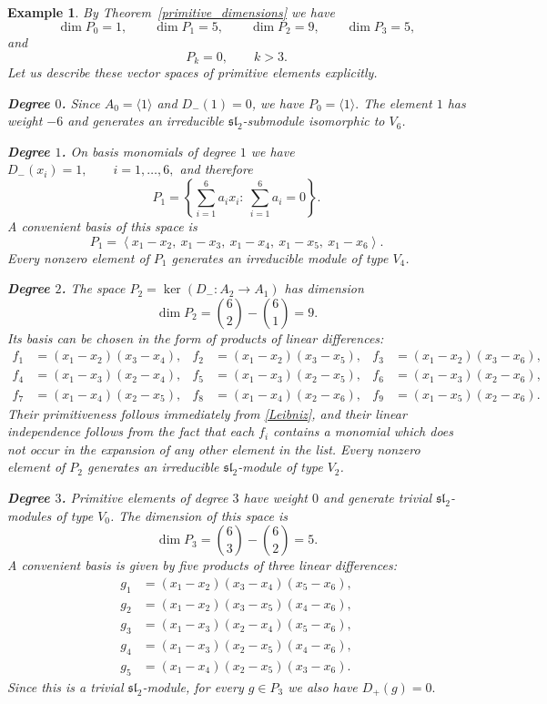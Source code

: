 \documentclass[12pt,reqno]{amsart}
\newtheorem{example}{Example}[section]
\begin{document}
\begin{example}
{\rm
By Theorem~\ref{primitive_dimensions} we have
$$
\dim P_0=1,\qquad
\dim P_1=5,\qquad
\dim P_2=9,\qquad
\dim P_3=5,
$$
and
$$
P_k=0,\qquad k>3.
$$
Let us describe these vector spaces of primitive elements explicitly.

\medskip

\noindent\textbf{Degree $0$.}
Since $A_0=\langle 1\rangle$ and $D_-(1)=0$, we have
$
P_0=\langle 1\rangle.
$
The element $1$ has weight $-6$ and generates an irreducible
$\mathfrak{sl}_2$-submodule isomorphic to $V_6$.

\medskip

\noindent\textbf{Degree $1$.}
On basis monomials of degree $1$ we have
$
D_-(x_i)=1,\qquad i=1,\dots,6,
$
and therefore
$$
P_1=\left\{\sum_{i=1}^6 a_i x_i:\ \sum_{i=1}^6 a_i=0\right\}.
$$
A convenient basis of this space is
$$
P_1=
\left\langle
x_1-x_2,\ x_1-x_3,\ x_1-x_4,\ x_1-x_5,\ x_1-x_6
\right\rangle.
$$
Every nonzero element of $P_1$ generates an irreducible module of type $V_4$.

\medskip

\noindent\textbf{Degree $2$.}
The space $P_2=\ker(D_-:A_2\to A_1)$ has dimension
$$
\dim P_2=\binom62-\binom61=9.
$$
Its basis can be chosen in the form of products of linear differences:
$$
\begin{aligned}
f_1&=(x_1-x_2)(x_3-x_4),&
f_2&=(x_1-x_2)(x_3-x_5),&
f_3&=(x_1-x_2)(x_3-x_6),\\
f_4&=(x_1-x_3)(x_2-x_4),&
f_5&=(x_1-x_3)(x_2-x_5),&
f_6&=(x_1-x_3)(x_2-x_6),\\
f_7&=(x_1-x_4)(x_2-x_5),&
f_8&=(x_1-x_4)(x_2-x_6),&
f_9&=(x_1-x_5)(x_2-x_6).
\end{aligned}
$$
Their primitiveness follows immediately from \eqref{Leibniz}, and their
linear independence follows from the fact that each $f_i$ contains a monomial
which does not occur in the expansion of any other element in the list.
Every nonzero element of $P_2$ generates an irreducible
$\mathfrak{sl}_2$-module of type $V_2$.

\medskip

\noindent\textbf{Degree $3$.}
Primitive elements of degree $3$ have weight $0$ and generate trivial
$\mathfrak{sl}_2$-modules of type $V_0$. The dimension of this space is
$$
\dim P_3=\binom63-\binom62=5.
$$
A convenient basis is given by five products of three linear differences:
$$
\begin{aligned}
g_1&=(x_1-x_2)(x_3-x_4)(x_5-x_6),\\
g_2&=(x_1-x_2)(x_3-x_5)(x_4-x_6),\\
g_3&=(x_1-x_3)(x_2-x_4)(x_5-x_6),\\
g_4&=(x_1-x_3)(x_2-x_5)(x_4-x_6),\\
g_5&=(x_1-x_4)(x_2-x_5)(x_3-x_6).
\end{aligned}
$$
Since this is a trivial $\mathfrak{sl}_2$-module, for every $g\in P_3$ we
also have
$
D_+(g)=0.
$

}
\end{example}
\end{document}
